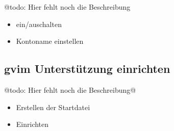 \documentclass[%
fontsize=12pt,%
parskip=half,%
version=last%
]{scrreprt}
\begin{document}
@todo: Hier fehlt noch die Beschreibung

\begin{itemize}
\itemsep1pt\parskip0pt
\item
  ein/auschalten
\item
  Kontoname einstellen
\end{itemize}

\subsection{gvim Unterstützung
einrichten}\label{gvim-unterstuxfctzung-einrichten}

@todo: Hier fehlt noch die Beschreibung@

\begin{itemize}
\itemsep1pt\parskip0pt
\item
  Erstellen der Startdatei
\item
  Einrichten
\end{itemize}


\end{document}

